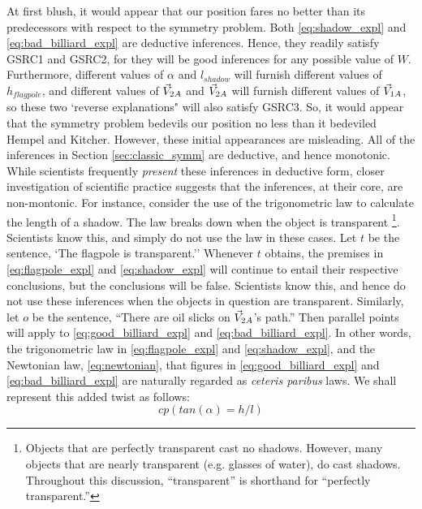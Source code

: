 \documentclass{svjour3}                     %
\renewcommand\vec{\mathaccent"017E}
\begin{document}
At first  blush, it would appear that our position fares no better than its predecessors with respect to the symmetry problem. Both \eqref{eq:shadow_expl} and \eqref{eq:bad_billiard_expl} are deductive inferences. Hence, they readily satisfy GSRC1 and GSRC2, for they will be good inferences for any possible value of $W$. Furthermore, different values of $\alpha$ and $l_{shadow}$ will furnish different values of $h_{flagpole}$, and different values of $\vec{V}_{2A}$ and $\vec{V}_{2A}$ will furnish different values of $\vec{V}_{1A}$, so these two `reverse explanations" will also satisfy GSRC3. So, it would appear that the symmetry problem bedevils our position no less than it bedeviled Hempel and Kitcher. \newline
\indent However, these initial appearances are misleading. All of the inferences in Section \ref{sec:classic_symm} are deductive, and hence monotonic. While scientists frequently \textit{present} these inferences in deductive form, closer investigation of scientific practice suggests that the inferences, at their core, are non-montonic. For instance, consider the use of the trigonometric law to calculate the length of a shadow. The law breaks down when the object is transparent \footnote{Objects that are perfectly transparent cast no shadows. However, many objects that are nearly transparent (e.g. glasses of water), do cast shadows. Throughout this discussion, ``transparent'' is shorthand for ``perfectly transparent.''}. Scientists know this, and simply do not use the law in these cases. Let $t$ be the sentence, `The flagpole is transparent.'' Whenever $t$ obtains, the premises in \eqref{eq:flagpole_expl} and \eqref{eq:shadow_expl} will continue to entail their respective conclusions, but the conclusions will be false. Scientists know this, and hence do not use these inferences when the objects in question are transparent. Similarly, let $o$ be the sentence, ``There are oil slicks on $\vec{V}_{2A}$'s path.'' Then parallel points will apply to \eqref{eq:good_billiard_expl} and \eqref{eq:bad_billiard_expl}.\newline
\indent In other words, the trigonometric law in \eqref{eq:flagpole_expl} and \eqref{eq:shadow_expl}, and the Newtonian law, \eqref{eq:newtonian}, that figures in \eqref{eq:good_billiard_expl} and \eqref{eq:bad_billiard_expl} are naturally regarded as \textit{ceteris paribus} laws. We shall represent this added twist as follows:
\begin{equation}
cp(tan(\alpha) = h/l)
\end{equation}
\end{document}
